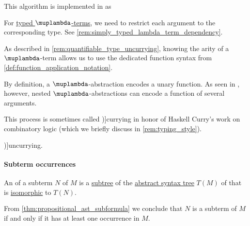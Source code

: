 \begin{comments}
  \item This algorithm is implemented in \cite{notebook:code} as
  \begin{CodeRefDisplay}
  \end{CodeRefDisplay}

  \item For \hyperref[def:typed_lambda_term]{typed \( \muplambda \)-terms}, we need to restrict each argument to the corresponding type. See \cref{rem:simply_typed_lambda_term_dependency}.

  \item As described in \cref{rem:quantifiable_type_uncurrying}, knowing the arity of a \( \muplambda \)-term allows us to use the dedicated function syntax from \cref{def:function_application_notation}.
\end{comments}

\begin{concept}\label{con:currying}
  By definition, a \( \muplambda \)-abstraction encodes a unary function. As seen in , however, nested \( \muplambda \)-abstractions can encode a function of several arguments.

  This process is sometimes called \term[en=currying (\cite[23]{UnivalentFoundationsProgram2013HoTT})]{currying} in honor of Haskell Curry's work on combinatory logic (which we briefly discuss in \cref{rem:typing_style}).

  \term[en=uncurrying (\cite[394]{Perrone2024StartingCategoryTheory})]{uncurrying}.
\end{concept}

\paragraph{Subterm occurrences}

\begin{definition}\label{def:lambda_subterm_occurrence}\mimprovised
  An  of a subterm \( N \) of \( M \) is a \hyperref[def:tree/subobject]{subtree} of the \hyperref[con:abstract_syntax_tree]{abstract syntax tree} \( T(M) \) of that is \hyperref[def:labeled_tree/morphism]{isomorphic} to \( T(N) \).
\end{definition}
\begin{comments}
  \item From \cref{thm:propositional_ast_subformula} we conclude that \( N \) is a subterm of \( M \) if and only if it has at least one occurrence in \( M \).
\end{comments}

